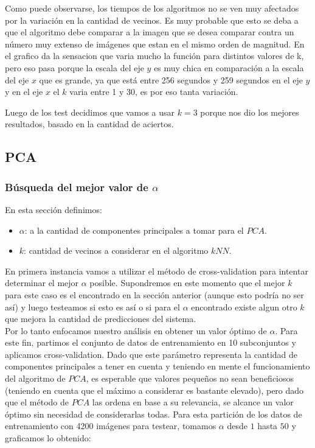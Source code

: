 Como puede observarse, los tiempos de los algoritmos no se ven muy afectados por la variación en la cantidad de vecinos. Es muy probable que esto se deba a que el algoritmo debe comparar a la imagen que se desea comparar contra un número muy extenso de imágenes que estan en el mismo orden de magnitud.
En el grafico da la sensacion que varia mucho la función para distintos valores de k, pero eso pasa porque la escala del eje $y$ es muy chica en comparación a la escala del eje $x$ que es grande, ya que está entre 256 segundos y 259 segundos en el eje $y$ y en el eje $x$  el $k$ varia entre 1 y 30, es por eso tanta variación.

Luego de los test decidimos que vamos a usar $k=3$ porque nos dio los mejores resultados, basado en la  cantidad de aciertos.

\subsection{PCA}
\subsubsection{Búsqueda del mejor valor de $\alpha$}
En esta sección definimos:
\begin{itemize}
	\item $\alpha$: a la cantidad de componentes principales a tomar para el $PCA$.
	\item $k$: cantidad de vecinos a considerar en el algoritmo $kNN$.
\end{itemize}
En primera instancia vamos a utilizar el método de cross-validation para intentar determinar el mejor $\alpha$ posible. Supondremos en este momento que el mejor $k$ para este caso es el encontrado en la sección anterior (aunque esto podría no ser así) y luego testeamos si esto es así o si para el $\alpha$ encontrado existe algun otro $k$ que mejora la cantidad de predicciones del sistema.
\\
Por lo tanto enfocamos nuestro análisis en obtener un valor óptimo de $\alpha$. Para este fin, partimos el conjunto de datos de entrenamiento en 10 subconjuntos y aplicamos cross-validation. Dado que este parámetro representa la cantidad de componentes principales a tener en cuenta y teniendo en mente el funcionamiento del algoritmo de $PCA$, es esperable que valores pequeños no sean beneficiosos (teniendo en cuenta que el máximo a considerar es bastante elevado), pero dado que el método de $PCA$ las ordena en base a su relevancia, se alcance un valor óptimo sin necesidad de considerarlas todas. Para esta partición de los datos de entrenamiento con 4200 imágenes para testear, tomamos $\alpha$ desde $1$ hasta $50$ y graficamos lo obtenido:

